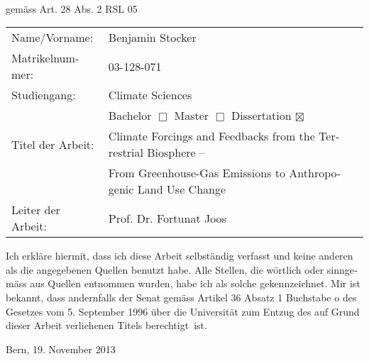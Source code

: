 \clearemptydoublepage
\onehalfspacing
\begin{otherlanguage}{ngerman}
\begin{center}
\textbf{\huge{}}\\

\vspace{1 cm}
\large
gem{\"a}ss Art. 28 Abs. 2 RSL 05
\end{center}
\vspace{1.7 cm}

\begin{tabular}{p{3.5 cm}ll}
  Name/Vorname:      & Benjamin Stocker \vspace{0.6 cm}\\
  Matrikelnummer:    & 03-128-071 \vspace{0.6 cm}\\
  Studiengang:       & Climate Sciences \vspace{0.6 cm}\\
                     & Bachelor $\Box$ \hspace{0.99 cm} Master $\Box$ \hspace{0.99 cm} Dissertation $\boxtimes$\vspace{0.6 cm}\\
  Titel der Arbeit:  & Climate Forcings and Feedbacks from the Terrestrial Biosphere --\vspace{0.1 cm}\\
                     & From Greenhouse-Gas Emissions to Anthropogenic Land Use Change\vspace{0.6 cm}\\
  Leiter der Arbeit: & Prof. Dr. Fortunat Joos\vspace{0.6 cm}\\
\end{tabular}

\vspace{1.3 cm}
Ich erkl{\"a}re hiermit, dass ich diese Arbeit selbst{\"a}ndig verfasst
und keine anderen als die angegebenen Quellen benutzt habe. Alle
Stellen, die w{\"o}rtlich oder sinngem{\"a}ss aus Quellen entnommen
wurden, habe ich als solche gekennzeichnet. Mir ist bekannt, dass
andernfalls der Senat gem{\"a}ss Artikel 36 Absatz 1 Buchstabe o des
Gesetzes vom 5. September 1996 {\"u}ber die Universit{\"a}t zum Entzug
des auf Grund dieser Arbeit verliehenen Titels berechtigt~ist.

\vspace{2.9 cm}


\hspace{9.5 cm}Bern, 19. November 2013\\
\normalsize
\thispagestyle{empty}
\normalsize

\singlespacing
\end{otherlanguage}
